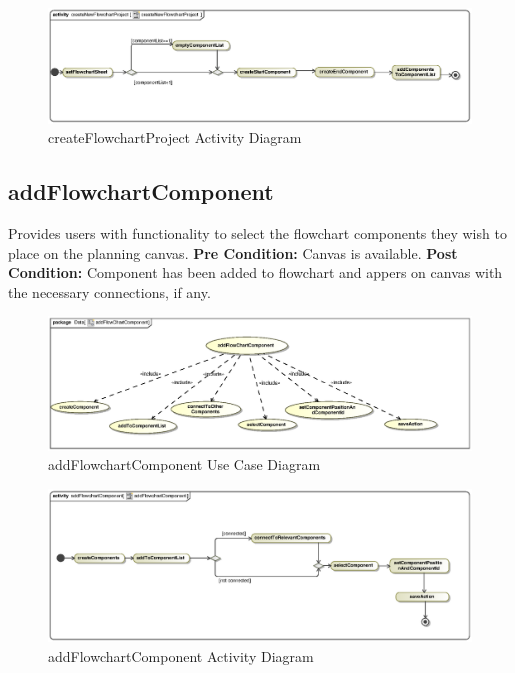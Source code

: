 \documentclass[11pt,a4paper,titlepage]{article}
\begin{document}
\begin{figure}[H]
  \centering
\includegraphics[width=500px]{createNewFlowchartProjectActivity.eps}
\caption{createFlowchartProject Activity Diagram}
\end{figure}

\newpage
\subsection{addFlowchartComponent}

Provides users with functionality to select the flowchart components they wish to place on the planning canvas.\newline\newline
\textbf{Pre Condition:} Canvas is available.\newline\newline
\textbf{Post Condition:} Component has been added to flowchart and appers on canvas with the necessary connections, if any.

\begin{figure}[H]
  \centering
\includegraphics[width=500px]{addFlowChartComponent.eps}
\caption{addFlowchartComponent Use Case Diagram}
\end{figure}

\begin{figure}[H]
  \centering
\includegraphics[width=500px]{addFlowchartComponentActivity.eps}
\caption{addFlowchartComponent Activity Diagram}
\end{figure}
\end{document}
